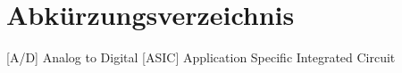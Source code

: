 \chapter*{Abkürzungsverzeichnis}\label{Kapitel:abbrev} %


\renewcommand*{\acsfont}[1]{\normalfont{\normalsize{#1}}} %



\begin{acronym}[LONGESTACRO] %
		
		
			
			
	
	    [A/D]   {Analog to Digital}	
	  [ASIC]  {Application Specific Integrated Circuit}
	
	
	
\end{acronym}


